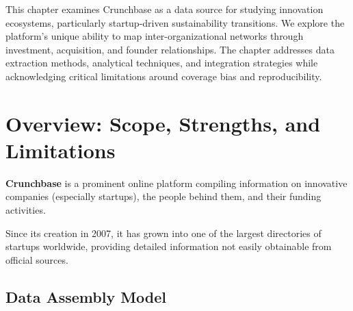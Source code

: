 \documentclass[../main.tex]{subfiles}
\begin{document}

\begin{center}
\end{center}

\vspace{0.5cm}

\begin{chapteroverview}
This chapter examines Crunchbase as a data source for studying innovation ecosystems, particularly startup-driven sustainability transitions. We explore the platform's unique ability to map inter-organizational networks through investment, acquisition, and founder relationships. The chapter addresses data extraction methods, analytical techniques, and integration strategies while acknowledging critical limitations around coverage bias and reproducibility.
\end{chapteroverview}


\section*{Overview: Scope, Strengths, and Limitations}

\textbf{Crunchbase} is a prominent online platform compiling information on innovative companies (especially startups), the people behind them, and their funding activities.


Since its creation in 2007, it has grown into one of the largest directories of startups worldwide, providing detailed information not easily obtainable from official sources.

\subsection*{Data Assembly Model}
\end{document}
